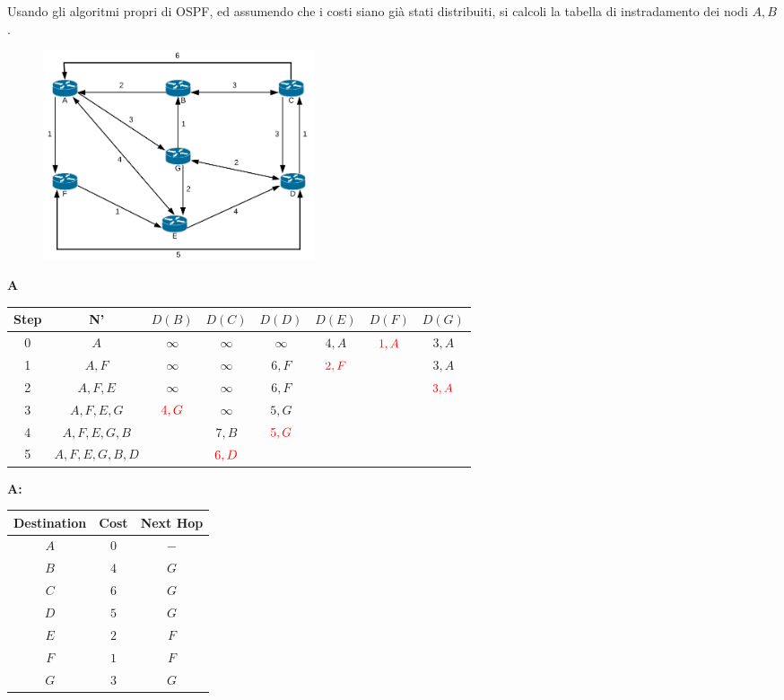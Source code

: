 \documentclass[10pt]{article}
\begin{document}
	Usando gli algoritmi propri di OSPF, ed assumendo che i costi siano già stati distribuiti, si calcoli la tabella di instradamento dei nodi ${A,B}$.
	\begin{figure}[h]
	\centering
	\includegraphics[width=8cm]{es8}
	\end{figure}
	\begin{center}
	\textbf{A}
 		\begin{tabular}{||c c c c c c c c||} 
 			\hline
 			Step & N' & $D(B)$ & $D(C)$ & $D(D)$ & $D(E)$ & $D(F)$ & $D(G)$ \\[0.5ex] 
 			\hline\hline
 			0 & $A$ & $\infty$ & $\infty$ & $\infty$ & $4,A$ &$\color{red} 1,A$ & $3,A$ \\
 			\hline
 			1 & $A,F$ & $\infty$ & $\infty$ & $6,F$ & $\color{red} 2,F$ & & $3,A$\\
 			\hline
 			2 & $A,F,E$ & $\infty$ & $\infty$ & $6,F$ & & & $\color{red} 3,A$ \\
 			\hline
 			3 & $A,F,E,G$ & $\color{red} 4,G$ & $\infty$ & $5,G$ & & & \\
 			\hline
 			4 & $A,F,E,G,B$ & & $7,B$ & $\color{red} 5,G$ & & & \\
 			\hline
 			5 & $A,F,E,G,B,D$ & & $\color{red} 6,D$ & & & & \\[0.5ex] 
 			\hline
		\end{tabular}
	\end{center}
	\begin{center}
	\textbf{A:}
		\begin{tabular}{||c || c || c||}
			\hline
 			Destination & Cost & Next Hop\\[0.5ex] 
 			\hline\hline
			$A$ & $0$ & $-$\\
			$B$ & $4$ & $G$\\
 			$C$ & $6$ & $G$\\
			$D$ & $5$ & $G$\\
			$E$ & $2$ & $F$\\
			$F$ & $1$ & $F$\\
			$G$ & $3$ & $G$\\[0.5ex] 
			\hline
		\end{tabular}
	\end{center}		
	
\end{document}
